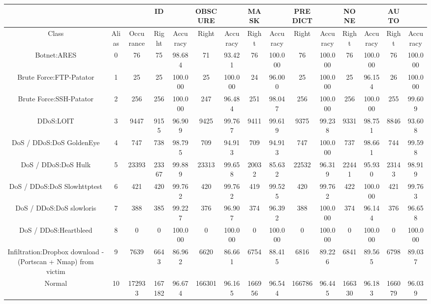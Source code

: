 \begin{table}[htb]
    \centering
    \begin{tabular}{@{}ccccccccccccccc@{}}
        \toprule
         &  &  & ID &  & OBSCURE &  & MASK &  & PREDICT &  & NONE &  & AUTO &  \\
        \midrule
        Class &  Alias &  Occurance &  Right &  Accuracy &  Right &  Accuracy &  Right &  Accuracy &  Right &  Accuracy &  Right &  Accuracy &  Right &  Accuracy \\
        Botnet:ARES &  0 &  76 &  75 &  98.684 &  71 &  93.421 &  76 &  100.000 &  76 &  100.000 &  76 &  100.000 &  76 &  100.000 \\
        Brute Force:FTP-Patator &  1 &  25 &  25 &  100.000 &  25 &  100.000 &  24 &  96.000 &  25 &  100.000 &  25 &  96.154 &  26 &  100.000 \\
        Brute Force:SSH-Patator &  2 &  256 &  256 &  100.000 &  247 &  96.484 &  251 &  98.047 &  256 &  100.000 &  256 &  100.000 &  255 &  99.609 \\
        DDoS:LOIT &  3 &  9447 &  9155 &  96.909 &  9425 &  99.767 &  9411 &  99.619 &  9375 &  99.238 &  9331 &  98.751 &  8846 &  93.608 \\
        DoS / DDoS:DoS GoldenEye &  4 &  747 &  738 &  98.795 &  709 &  94.913 &  709 &  94.913 &  747 &  100.000 &  737 &  98.661 &  744 &  99.598 \\
        DoS / DDoS:DoS Hulk &  5 &  23393 &  23367 &  99.889 &  23313 &  99.658 &  20032 &  85.632 &  22532 &  96.319 &  22441 &  95.930 &  23143 &  98.919 \\
        DoS / DDoS:DoS Slowhttptest &  6 &  421 &  420 &  99.762 &  420 &  99.762 &  419 &  99.525 &  420 &  99.762 &  422 &  100.000 &  421 &  99.763 \\
        DoS / DDoS:DoS slowloris &  7 &  388 &  385 &  99.227 &  376 &  96.907 &  374 &  96.392 &  388 &  100.000 &  374 &  96.144 &  376 &  96.658 \\
        DoS / DDoS:Heartbleed &  8 &  0 &  0 &  100.000 &  0 &  100.000 &  0 &  100.000 &  0 &  100.000 &  0 &  100.000 &  0 &  100.000 \\
        Infiltration:Dropbox download - (Portscan + Nmap) from victim &  9 &  7639 &  6643 &  86.962 &  6620 &  86.661 &  6754 &  88.415 &  6816 &  89.226 &  6841 &  89.565 &  6798 &  89.037 \\
        Normal &  10 &  172933 &  167182 &  96.674 &  166301 &  96.165 &  166956 &  96.544 &  166786 &  96.445 &  166330 &  96.183 &  166079 &  96.039 \\

\end{tabular}
\end{table}
